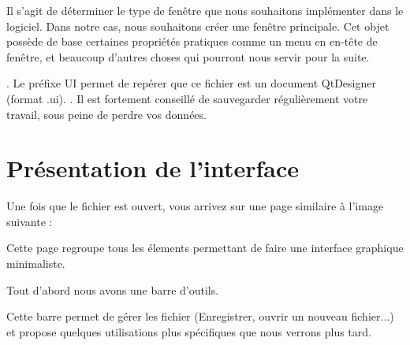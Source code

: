 

Il s'agit de déterminer le type de fenêtre que nous souhaitons implémenter dans le logiciel. Dans notre cas, nous souhaitons créer une fenêtre principale. Cet objet possède de base certaines propriétés pratiques comme un menu en en-tête de fenêtre, et beaucoup d'autres choses qui pourront nous servir pour la suite.

. \newline
Le préfixe UI permet de repérer que ce fichier est un document QtDesigner (format .ui). . \newline \newline 
{\color{red}Il est fortement conseillé de sauvegarder régulièrement votre travail, sous peine de perdre vos données.}




\section{Présentation de l'interface}

Une fois que le fichier  est ouvert, vous arrivez sur une page similaire à l'image suivante : \newline


Cette page regroupe tous les élements permettant de faire une interface graphique minimaliste.


Tout d'abord nous avons une barre d'outils. \newline



Cette barre permet de gérer les fichier (Enregistrer, ouvrir un nouveau fichier...) et propose quelques utilisations plus spécifiques que nous verrons plus tard. \newline

